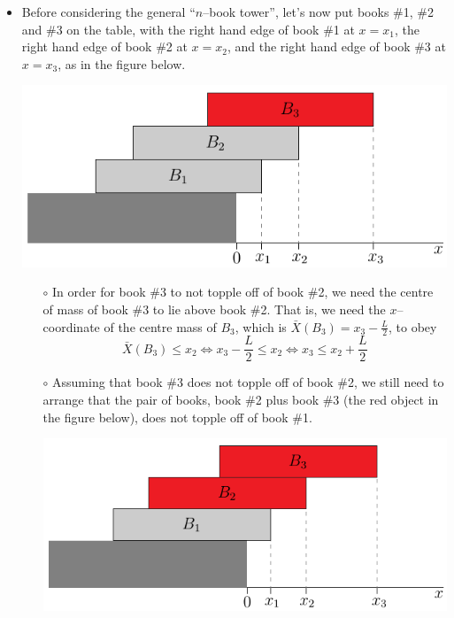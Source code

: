 \begin{itemize}
\item
Before considering the general ``$n$--book tower'', let's now put
books \#1, \#2 and \#3
on the table, with the right hand edge of book \#1 at $x=x_1$,
the right hand edge of book \#2 at  $x=x_2$, and the right
hand edge of book \#3 at $x=x_3$, as in the figure below.
\begin{efig}
\begin{center}
     \includegraphics{bookStackV3a.pdf}
\end{center}
\end{efig}
\begin{itemize}\itemsep1pt \parskip0pt  \itemindent-10pt
\item[$\circ$]
In order for book \#3 to not topple off of book \#2, we need the
centre of mass of book \#3 to lie above book \#2. That is, we need
the $x$--coordinate of the centre mass of $B_3$, which is
$\bar X(B_3)=x_3-\frac{L}{2}$, to obey
\begin{equation*}
\bar X(B_3) \le x_2
\iff
x_3-\frac{L}{2} \le x_2
\iff
x_3\le x_2+\frac{L}{2}
\end{equation*}
\item[$\circ$]
Assuming that book \#3 does not topple off of book \#2, we still
need to arrange that the pair of books, book \#2 plus book \#3 (the
red object in the figure below), does not topple off of book \#1.
\begin{efig}
\begin{center}
     \includegraphics{bookStackV3b.pdf}

\end{center}
\end{efig}
\end{itemize}
\end{itemize}
